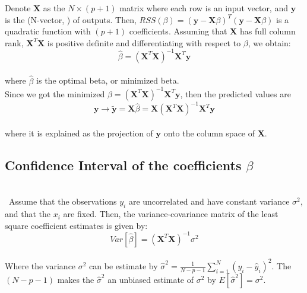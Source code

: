 \documentclass{article}
\begin{document}
Denote $\textbf{X}$ as the $N\times(p+1)$ matrix where each row is an input vector, and $\textbf{y}$ is the (N-vector, ) of outputs. Then, $RSS(\beta)=(\textbf{y}-\textbf{X}\beta)^T(\textbf{y}-\textbf{X}\beta)$ is a quadratic function with $(p+1)$ coefficients. Assuming that $\textbf{X}$ has full column rank, $\textbf{X}^T\textbf{X}$ is positive definite and differentiating with respect to $\beta$, we obtain:\\

\begin{equation}
\label{eq3}
\hat{\beta}=(\textbf{X}^T\textbf{X})^{-1}\textbf{X}^T\textbf{y}
\end{equation}\\

\noindent where $\hat{\beta}$ is the optimal beta, or minimized beta.\\

Since we got the minimized $\hat{\beta}=(\textbf{X}^T\textbf{X})^{-1}\textbf{X}^T\textbf{y}$, then the predicted values are\\

\begin{equation}
\label{eq4}
\textbf{y} \rightarrow \tilde{\textbf{y}}=\textbf{X}\hat{\beta}=\textbf{X}(\textbf{X}^T\textbf{X})^{-1}\textbf{X}^T\textbf{y}
\end{equation}\\

\noindent where it is explained as the projection of $\textbf{y}$ onto the column space of $\textbf{X}$.\\

\subsection{Confidence Interval of the coefficients $\beta$}\\

\qquad \, Assume that the observations $y_i$ are uncorrelated and have constant variance $\sigma^2$, and that the $x_i$ are fixed. Then, the variance-covariance matrix of the least square coefficient estimates is given by: \\

\begin{equation}
\label{eq5}
Var[\hat{\beta}]=(\textbf{X}^T\textbf{X})^{-1}\sigma^2
\end{equation}\\

Where the variance $\sigma^2$ can be estimate by $\hat{\sigma}^2=\frac{1}{N-p-1}\sum^N_{i=1}(y_i-\hat{y}_i)^2$. The $(N-p-1)$ makes the $\hat{\sigma}^2$ an unbiased estimate of $\sigma^2$ by $E[\hat{\sigma}^2]=\sigma^2$.\\
\end{document}
